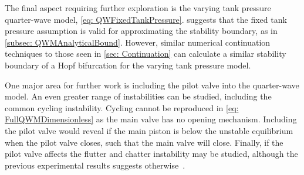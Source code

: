 The final aspect requiring further exploration is the varying tank pressure quarter-wave model, \cref{eq: QWFixedTankPressure}.  suggests that the fixed tank pressure assumption is valid for approximating the stability boundary, as in \cref{subsec: QWMAnalyticalBound}. However, similar numerical continuation techniques to those seen in \cref{sec: Continuation} can calculate a similar stability boundary of a Hopf bifurcation for the varying tank pressure model. %

One major area for further work is including the pilot valve into the quarter-wave model. An even greater range of instabilities can be studied, including the common cycling instability. Cycling cannot be reproduced in \cref{eq: FullQWMDimensionless} as the main valve has no opening mechanism. Including the pilot valve would reveal if the main piston is below the unstable equilibrium when the pilot valve closes, such that the main valve will close. Finally, if the pilot valve affects the flutter and chatter instability may be studied, although the previous experimental results suggests otherwise~\cite{Allison2015TestingValves}.
% 
% 
% 